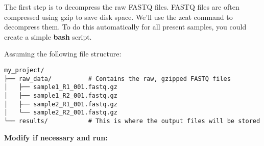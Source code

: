 \documentclass[
  letterpaper,
  DIV=11,
  numbers=noendperiod]{scrreprt}
\begin{document}
The first step is to decompress the raw FASTQ files. FASTQ files are
often compressed using gzip to save disk space. We'll use the zcat
command to decompress them. To do this automatically for all present
samples, you could create a simple \textbf{bash} script.

Assuming the following file structure:

\begin{verbatim}
my_project/
├── raw_data/          # Contains the raw, gzipped FASTQ files
│   ├── sample1_R1_001.fastq.gz
│   ├── sample1_R2_001.fastq.gz
│   ├── sample2_R1_001.fastq.gz
│   └── sample2_R2_001.fastq.gz
└── results/           # This is where the output files will be stored
\end{verbatim}

\textbf{Modify if necessary and run:}
\end{document}
